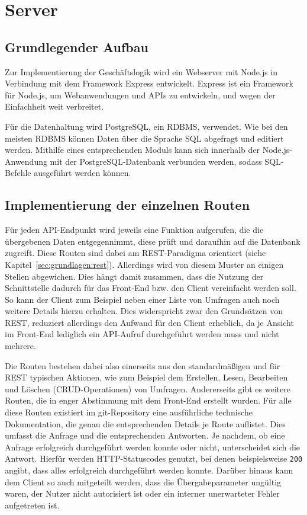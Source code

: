 \section{Server}

\subsection{Grundlegender Aufbau}
Zur Implementierung der Geschäftslogik wird ein Webserver mit Node.js in Verbindung mit dem Framework Express entwickelt.
Express ist ein Framework für Node.js, um Webanwendungen und \acsp{API} zu entwickeln, und wegen der Einfachheit weit verbreitet.\autocite[Vgl.][]{nl-strongloop2017express}

Für die Datenhaltung wird PostgreSQL, ein \ac{RDBMS}, verwendet.
Wie bei den meisten \acs{RDBMS} können Daten über die Sprache \acs{SQL} abgefragt und editiert werden. %
Mithilfe eines entsprechenden Moduls kann sich innerhalb der Node.js-Anwendung mit der PostgreSQL-Datenbank verbunden werden, sodass \acs{SQL}-Befehle ausgeführt werden können.\autocite[Vgl.][]{nl-carlson2020nodepostgres}

\subsection{Implementierung der einzelnen Routen}
Für jeden \acs{API}-Endpunkt wird jeweils eine Funktion aufgerufen, die die übergebenen Daten entgegennimmt, diese prüft und daraufhin auf die Datenbank zugreift.
Diese Routen sind dabei am \acs{REST}-Paradigma orientiert (siehe Kapitel~\vref{sec:grundlagen:rest}).
Allerdings wird von diesem Muster an einigen Stellen abgewichen.
Dies hängt damit zusammen, dass die Nutzung der Schnittstelle dadurch für das Front-End bzw. den Client vereinfacht werden soll.
So kann der Client zum Beispiel neben einer Liste von Umfragen auch noch weitere Details hierzu erhalten.
Dies widerspricht zwar den Grundsätzen von \acs{REST}, reduziert allerdings den Aufwand für den Client erheblich, da je Ansicht im Front-End lediglich ein \acs{API}-Aufruf durchgeführt werden muss und nicht mehrere.

Die Routen bestehen dabei also einerseits aus den standardmäßigen und für \acs{REST} typischen Aktionen, wie zum Beispiel dem Erstellen, Lesen, Bearbeiten und Löschen (\acs{CRUD}-Operationen) von Umfragen.
Andererseits gibt es weitere Routen, die in enger Abstimmung mit dem Front-End erstellt wurden.
Für alle diese Routen existiert im git-Repository eine ausführliche technische Dokumentation, die genau die entsprechenden Details je Route auflistet.
Dies umfasst die Anfrage und die entsprechenden Antworten.
Je nachdem, ob eine Anfrage erfolgreich durchgeführt werden konnte oder nicht, unterscheidet sich die Antwort.
Hierfür werden \acs{HTTP}-Statuscodes genutzt, bei denen beispielsweise \texttt{200} angibt, dass alles erfolgreich durchgeführt werden konnte.
Darüber hinaus kann dem Client so auch mitgeteilt werden, dass die Übergabeparameter ungültig waren, der Nutzer nicht autorisiert ist oder ein interner unerwarteter Fehler aufgetreten ist.\autocite[Vgl.][S. 51 ff]{nl-rfc7231}

